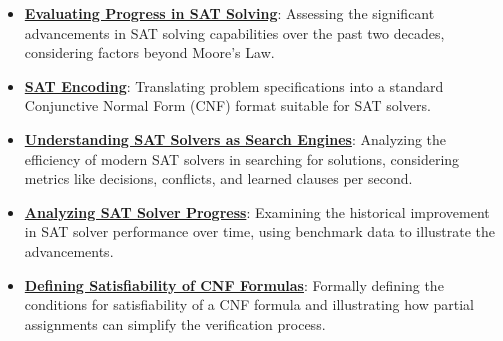 \documentclass{article}%
\begin{document}
\begin{itemize}[leftmargin=*]
\item \href{https://purdue.brightspace.com/d2l/common/assets/pdfjs-d2l-dist/1.0.14-legacy/web/viewer.html?file=%2Fcontent%2Fenforced%2F1095467-wl.202510.CS.24300.001%2F15L2-SAT.pdf%3Fou%3D1095467&lang=en-us&container=d2l-fileviewer-rendered-pdf&fullscreen=d2l-fileviewer-rendered-pdf-dialog&height=667#page=5}{\textbf{Evaluating Progress in SAT Solving}}: Assessing the significant advancements in SAT solving capabilities over the past two decades, considering factors beyond Moore's Law.%
\item \href{https://purdue.brightspace.com/d2l/common/assets/pdfjs-d2l-dist/1.0.14-legacy/web/viewer.html?file=%2Fcontent%2Fenforced%2F1095467-wl.202510.CS.24300.001%2F15L2-SAT.pdf%3Fou%3D1095467&lang=en-us&container=d2l-fileviewer-rendered-pdf&fullscreen=d2l-fileviewer-rendered-pdf-dialog&height=667#page=7}{\textbf{SAT Encoding}}: Translating problem specifications into a standard Conjunctive Normal Form (CNF) format suitable for SAT solvers.%
\item \href{https://purdue.brightspace.com/d2l/common/assets/pdfjs-d2l-dist/1.0.14-legacy/web/viewer.html?file=%2Fcontent%2Fenforced%2F1095467-wl.202510.CS.24300.001%2F15L2-SAT.pdf%3Fou%3D1095467&lang=en-us&container=d2l-fileviewer-rendered-pdf&fullscreen=d2l-fileviewer-rendered-pdf-dialog&height=667#page=11}{\textbf{Understanding SAT Solvers as Search Engines}}: Analyzing the efficiency of modern SAT solvers in searching for solutions, considering metrics like decisions, conflicts, and learned clauses per second.%
\item \href{https://purdue.brightspace.com/d2l/common/assets/pdfjs-d2l-dist/1.0.14-legacy/web/viewer.html?file=%2Fcontent%2Fenforced%2F1095467-wl.202510.CS.24300.001%2F15L2-SAT.pdf%3Fou%3D1095467&lang=en-us&container=d2l-fileviewer-rendered-pdf&fullscreen=d2l-fileviewer-rendered-pdf-dialog&height=667#page=12}{\textbf{Analyzing SAT Solver Progress}}: Examining the historical improvement in SAT solver performance over time, using benchmark data to illustrate the advancements.%
\item \href{https://purdue.brightspace.com/d2l/common/assets/pdfjs-d2l-dist/1.0.14-legacy/web/viewer.html?file=%2Fcontent%2Fenforced%2F1095467-wl.202510.CS.24300.001%2F15L2-SAT.pdf%3Fou%3D1095467&lang=en-us&container=d2l-fileviewer-rendered-pdf&fullscreen=d2l-fileviewer-rendered-pdf-dialog&height=667#page=13}{\textbf{Defining Satisfiability of CNF Formulas}}: Formally defining the conditions for satisfiability of a CNF formula and illustrating how partial assignments can simplify the verification process.%

\end{itemize}
\end{document}
